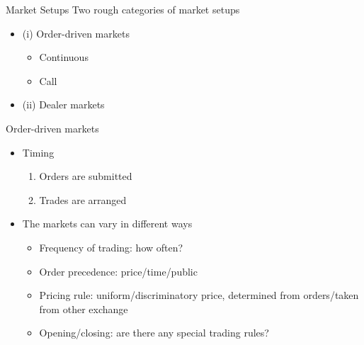 \documentclass[english,10pt
,aspectratio=169
]{beamer}
\begin{document}


\begin{frame}{Market Setups}
Two rough categories of market setups
\begin{itemize}
	\item (i) Order-driven markets
	\begin{itemize}
		\item Continuous
		\item Call
	\end{itemize}
	\item (ii) Dealer markets
\end{itemize}
\end{frame}


\begin{frame}{Order-driven markets}
\begin{itemize}
	\item Timing
	\begin{enumerate}
		\item Orders are submitted
		\item Trades are arranged
	\end{enumerate}
	\item The markets can vary in different ways
	\begin{itemize}
		\item Frequency of trading: how often?
		\item Order precedence: price/time/public
		\item Pricing rule: uniform/discriminatory price, determined from orders/taken from other exchange
		\item Opening/closing: are there any special trading rules?
	\end{itemize}
\end{itemize}
\end{frame}
\end{document}
